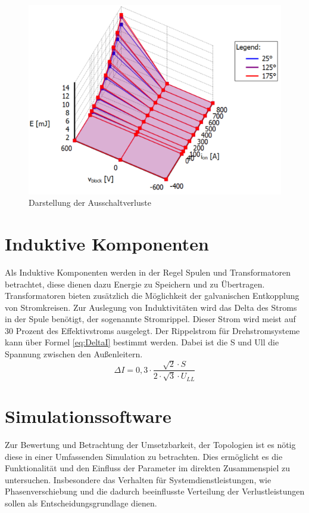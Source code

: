 \begin{figure}
	\centering
	\includegraphics[width=0.7\linewidth]{content/Grafiken/PLECS_FF2ThermalModel}
	\caption[Darstellung der Ausschaltverluste]{Darstellung der Ausschaltverluste}
	\label{fig:plecsff2thermalmodel}
\end{figure}

\section{Induktive Komponenten}
Als Induktive Komponenten werden in der Regel Spulen und Transformatoren betrachtet, diese dienen dazu Energie zu Speichern und zu Übertragen. Transformatoren bieten zusätzlich die Möglichkeit der galvanischen Entkopplung von Stromkreisen. 
Zur Auslegung von Induktivitäten wird das Delta des Stroms in der Spule benötigt, der sogenannte Stromrippel. Dieser Strom wird meist auf 30 Prozent des Effektivstroms ausgelegt. Der Rippelstrom für Drehstromsysteme kann über Formel \ref{eq:DeltaI} bestimmt werden. Dabei ist die \gls{S} und \gls{Ull} die Spannung zwischen den Außenleitern.\\
\begin{equation}
	\label{eq:DeltaI}
	 \Delta I = 0,3 \cdot \dfrac{\sqrt{2} \cdot S}{2 \cdot \sqrt{3} \cdot U_{LL}}
\end{equation}

\section{Simulationssoftware}
Zur Bewertung und Betrachtung der Umsetzbarkeit, der Topologien ist es nötig diese in einer Umfassenden Simulation zu betrachten. Dies ermöglicht es die Funktionalität und den Einfluss der Parameter im direkten Zusammenspiel zu untersuchen. Insbesondere das Verhalten für Systemdienstleistungen, wie Phasenverschiebung und die dadurch beeinflusste Verteilung der Verlustleistungen sollen als Entscheidungsgrundlage dienen. 

